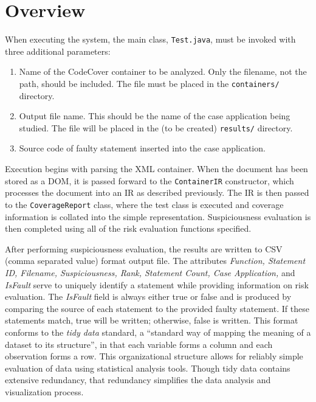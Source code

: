 \section{Overview} \label{sec:over}

When executing the system, the main class, \texttt{Test.java}, must be invoked with three additional
parameters:

\begin{enumerate}
\item Name of the CodeCover container to be analyzed.  Only the filename, not the path, should be included.  The file must be placed in the \texttt{containers/} directory.
\item Output file name.  This should be the name of the case application being studied.  The file will be placed in the (to be created) \texttt{results/} directory.
\item Source code of faulty statement inserted into the case application.
\end{enumerate}

Execution begins with parsing the XML container.  When the document has been stored as a DOM, it is
passed forward to the \texttt{ContainerIR} constructor, which processes the document into an IR as
described previously.  The IR is then passed to the \texttt{CoverageReport} class, where the 
test class is executed and coverage information is collated into the simple representation.
Suspiciousness evaluation is then completed using all of the risk evaluation functions specified.

After performing suspiciousness evaluation, the results are written to CSV (comma
separated value) format output file.  The attributes \textit{Function, Statement ID, Filename, Suspiciousness, Rank,
Statement Count, Case Application,} and \textit{IsFault} serve to uniquely identify a statement 
while providing information on risk evaluation.  The \textit{IsFault} field is always either true or 
false and is produced by comparing the source of each statement to the provided faulty statement. 
If these statements match, true will be written; otherwise, false is written.
This format conforms to the \textit{tidy data} \cite{tidy} standard, a ``standard way of mapping the meaning of a 
dataset to its structure'', in that each variable forms a column and each observation forms a row.  
This organizational structure allows for reliably simple evaluation of data using statistical 
analysis tools.  Though tidy data contains extensive redundancy, that redundancy simplifies
the data analysis and visualization process.